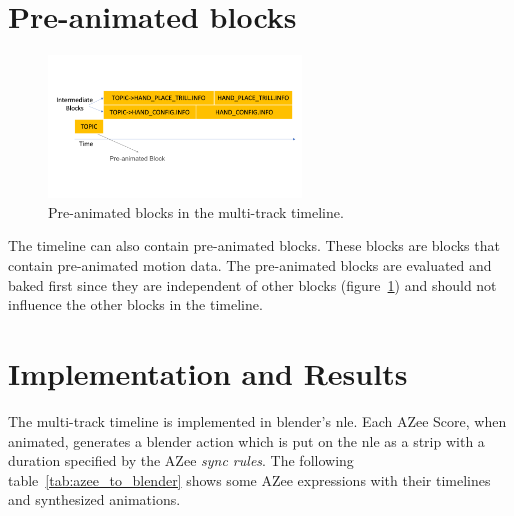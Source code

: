 \documentclass[../../main.tex]{subfiles}
\begin{document}
\section{Pre-animated blocks}
\label{ch:multi_track:preanim_blocks}

\begin{figure}[H]
    \centering
    \includegraphics[width=0.6\textwidth]{chapters/multi_track/images/preanim_blocks.png}
    \caption{Pre-animated blocks in the multi-track timeline.}
    \label{fig:preanim_blocks}
\end{figure}


The timeline can also contain pre-animated blocks. These blocks are blocks that contain pre-animated motion data. The pre-animated blocks are evaluated and baked first since they are independent of other blocks (figure~\ref{fig:preanim_blocks}) and should not influence the other blocks in the timeline.

\section{Implementation and Results}
\label{ch:multi_track:implem_results}

The multi-track timeline is implemented in blender's \gls{nle}. Each AZee Score, when animated, generates a blender action which is put on the \gls{nle} as a strip with a duration specified by the AZee \emph{sync rules}. The following table~\ref{tab:azee_to_blender} shows some AZee expressions with their timelines and synthesized animations.
\end{document}
